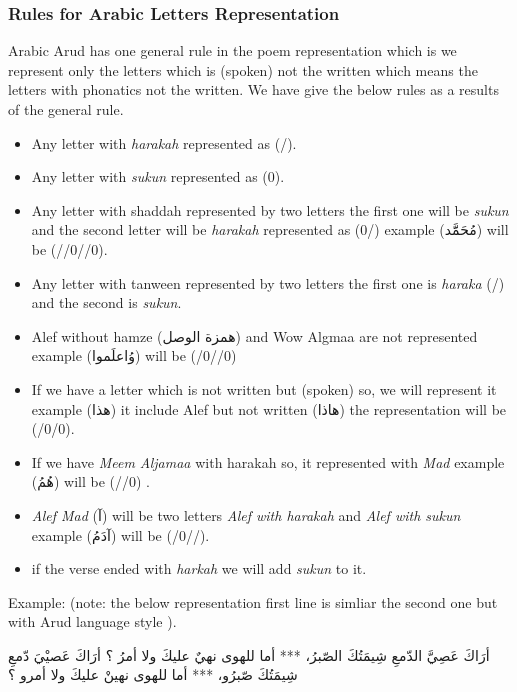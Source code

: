 \newpage
  \subsubsection{Rules for Arabic Letters Representation}
  Arabic Arud has one general rule in the poem representation which is we represent only the letters which is (spoken) not the written which means the letters with phonatics not the written. We have give the below rules as a results of the general rule.

  \begin{itemize}
  \item Any letter with \textit{harakah} represented as (/).
  \item Any letter with \textit{sukun} represented as (0).
  \item Any letter with shaddah represented by two letters the first one will be \textit{sukun} and the second letter will be \textit{harakah} represented as (0/) example (\textarabic{مُحَمََّد}) will be (//0//0).
  \item Any letter with tanween represented by two letters the first one is \textit{haraka} (/) and the second is \textit{sukun}.
  \item Alef without hamze (\textarabic{همزة الوصل}) and Wow Algmaa are not represented example (\textarabic{وُاعلَموا}) will be (/0//0)
  \item If we have a letter which is not written but (spoken) so, we will represent it example (\textarabic{هذا}) it include Alef but not written (\textarabic{هاذا}) the representation will be (/0/0).
  \item If we have \textit{Meem Aljamaa} with harakah so, it represented with \textit{Mad} example (\textarabic{هُمُ}) will be (//0) .
  \item \textit{Alef Mad} (\textarabic{آ}) will be two letters \textit{Alef with harakah} and \textit{Alef with sukun} example (\textarabic{آدَمُ}) will be (/0//).
    \item if the verse ended with \textit{harkah} we will add \textit{sukun} to it.


    \end{itemize}
Example: (note: the below representation first line is simliar the second one but with Arud language style ).
\begin{Arabic}
  \begin{traditionalpoem*}

    أرَاكَ عَصِيَّ الدّمعِ شِيمَتُكَ الصّبرُ، *** أما للهوى نهيٌ عليكَ ولا أمرُ ؟
     أرَاكَ عَصيْيَ دّمعِ شِيمَتُكَ صّبرُو، ***  أما للهوى نهينْ عليكَ ولا أمرو ؟
    
	\end{traditionalpoem*}
\end{Arabic}
\newpage

